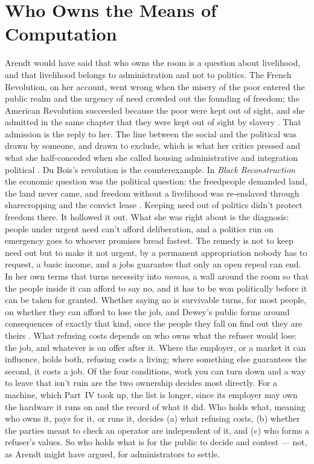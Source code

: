 \chapter{Who Owns the Means of Computation}
\label{sec:16}
Arendt would have said that who owns the room is a question about livelihood, and that livelihood belongs to administration and not to politics. The French Revolution, on her account, went wrong when the misery of the poor entered the public realm and the urgency of need crowded out the founding of freedom; the American Revolution succeeded because the poor were kept out of sight, and she admitted in the same chapter that they were kept out of sight by slavery \autocite[ch.~2]{arendt1963revolution}. That admission is the reply to her. The line between the social and the political was drawn by someone, and drawn to exclude, which is what her critics pressed and what she half-conceded when she called housing administrative and integration political \autocite{pitkin1998blob,arendt1979ontoronto}. Du Bois's revolution is the counterexample. In \emph{Black Reconstruction} the economic question was the political question: the freedpeople demanded land, the land never came, and freedom without a livelihood was re-enslaved through sharecropping and the convict lease \autocite{dubois1935black}. Keeping need out of politics didn't protect freedom there. It hollowed it out. What she was right about is the diagnosis: people under urgent need can't afford deliberation, and a politics run on emergency goes to whoever promises bread fastest. The remedy is not to keep need out but to make it not urgent, by a permanent appropriation nobody has to request, a basic income, and a jobs guarantee that only an open repeal can end. In her own terms that turns necessity into \emph{nomos}, a wall around the room so that the people inside it can afford to say no, and it has to be won politically before it can be taken for granted. Whether saying no is survivable turns, for most people, on whether they can afford to lose the job, and Dewey's public forms around consequences of exactly that kind, once the people they fall on find out they are theirs \autocite{dewey1927public}. What refusing costs depends on who owns what the refuser would lose: the job, and whatever is on offer after it. Where the employer, or a market it can influence, holds both, refusing costs a living; where something else guarantees the second, it costs a job. Of the four conditions, work you can turn down and a way to leave that isn't ruin are the two ownership decides most directly. For a machine, which Part~IV took up, the list is longer, since its employer may own the hardware it runs on and the record of what it did. Who holds what, meaning who owns it, pays for it, or runs it, decides (a) what refusing costs, (b) whether the parties meant to check an operator are independent of it, and (c) who forms a refuser's values. So who holds what is for the public to decide and contest — not, as Arendt might have argued, for administrators to settle.

